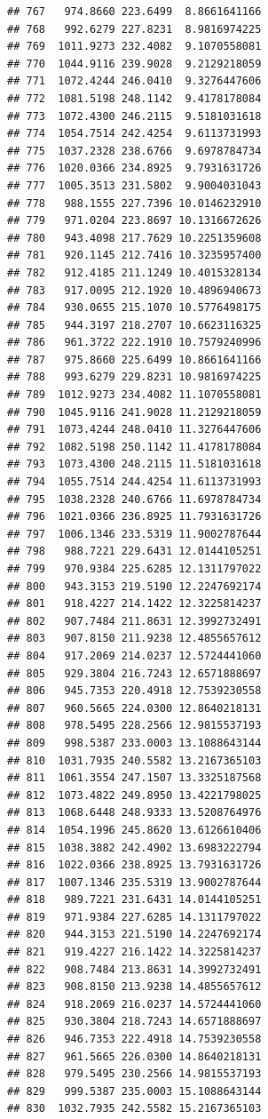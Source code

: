 \documentclass[
]{article}
\begin{document}
\begin{verbatim}
## 767   974.8660 223.6499  8.8661641166
## 768   992.6279 227.8231  8.9816974225
## 769  1011.9273 232.4082  9.1070558081
## 770  1044.9116 239.9028  9.2129218059
## 771  1072.4244 246.0410  9.3276447606
## 772  1081.5198 248.1142  9.4178178084
## 773  1072.4300 246.2115  9.5181031618
## 774  1054.7514 242.4254  9.6113731993
## 775  1037.2328 238.6766  9.6978784734
## 776  1020.0366 234.8925  9.7931631726
## 777  1005.3513 231.5802  9.9004031043
## 778   988.1555 227.7396 10.0146232910
## 779   971.0204 223.8697 10.1316672626
## 780   943.4098 217.7629 10.2251359608
## 781   920.1145 212.7416 10.3235957400
## 782   912.4185 211.1249 10.4015328134
## 783   917.0095 212.1920 10.4896940673
## 784   930.0655 215.1070 10.5776498175
## 785   944.3197 218.2707 10.6623116325
## 786   961.3722 222.1910 10.7579240996
## 787   975.8660 225.6499 10.8661641166
## 788   993.6279 229.8231 10.9816974225
## 789  1012.9273 234.4082 11.1070558081
## 790  1045.9116 241.9028 11.2129218059
## 791  1073.4244 248.0410 11.3276447606
## 792  1082.5198 250.1142 11.4178178084
## 793  1073.4300 248.2115 11.5181031618
## 794  1055.7514 244.4254 11.6113731993
## 795  1038.2328 240.6766 11.6978784734
## 796  1021.0366 236.8925 11.7931631726
## 797  1006.1346 233.5319 11.9002787644
## 798   988.7221 229.6431 12.0144105251
## 799   970.9384 225.6285 12.1311797022
## 800   943.3153 219.5190 12.2247692174
## 801   918.4227 214.1422 12.3225814237
## 802   907.7484 211.8631 12.3992732491
## 803   907.8150 211.9238 12.4855657612
## 804   917.2069 214.0237 12.5724441060
## 805   929.3804 216.7243 12.6571888697
## 806   945.7353 220.4918 12.7539230558
## 807   960.5665 224.0300 12.8640218131
## 808   978.5495 228.2566 12.9815537193
## 809   998.5387 233.0003 13.1088643144
## 810  1031.7935 240.5582 13.2167365103
## 811  1061.3554 247.1507 13.3325187568
## 812  1073.4822 249.8950 13.4221798025
## 813  1068.6448 248.9333 13.5208764976
## 814  1054.1996 245.8620 13.6126610406
## 815  1038.3882 242.4902 13.6983222794
## 816  1022.0366 238.8925 13.7931631726
## 817  1007.1346 235.5319 13.9002787644
## 818   989.7221 231.6431 14.0144105251
## 819   971.9384 227.6285 14.1311797022
## 820   944.3153 221.5190 14.2247692174
## 821   919.4227 216.1422 14.3225814237
## 822   908.7484 213.8631 14.3992732491
## 823   908.8150 213.9238 14.4855657612
## 824   918.2069 216.0237 14.5724441060
## 825   930.3804 218.7243 14.6571888697
## 826   946.7353 222.4918 14.7539230558
## 827   961.5665 226.0300 14.8640218131
## 828   979.5495 230.2566 14.9815537193
## 829   999.5387 235.0003 15.1088643144
## 830  1032.7935 242.5582 15.2167365103

\end{verbatim}
\end{document}
